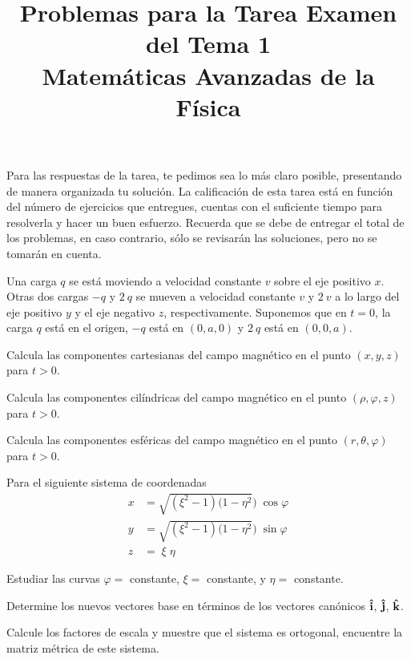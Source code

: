 \documentclass[12pt]{article}
\title{Problemas para la Tarea Examen del Tema 1\\ \large{Matemáticas Avanzadas de la Física}\vspace{-3ex}}
\date{ }
\begin{document}
\vspace{-4cm}
\renewcommand\labelenumii{\theenumi.{\arabic{enumii}}}
\maketitle
\fontsize{14}{14}\selectfont
Para las respuestas de la tarea, te pedimos sea lo más claro posible, presentando de manera organizada tu solución. La calificación de esta tarea está en función del número de ejercicios que entregues, cuentas con el suficiente tiempo para resolverla y hacer un buen esfuerzo. Recuerda que se debe de entregar el total de los problemas, en caso contrario, sólo se  revisarán las soluciones, pero no se tomarán en cuenta.
\begin{milista}
\item Una carga $q$ se está moviendo a velocidad constante $v$ sobre el eje positivo $x$. Otras dos cargas $-q$ y $2 \: q$ se mueven a velocidad constante $v$ y $2 \: v$ a lo largo del eje positivo $y$ y el eje negativo $z$, respectivamente. Suponemos que en $t = 0$, la carga $q$ está en el origen, $-q$ está en $(0, a, 0)$ y $2 \: q$ está en $(0, 0, a)$.
\begin{milista}
\item Calcula las componentes cartesianas del campo magnético en el punto $(x, y, z)$ para $t > 0$.
\item Calcula las componentes cilíndricas del campo magnético en el punto $(\rho, \varphi, z)$ para $t > 0$.
\item Calcula las componentes esféricas del campo magnético en el punto $(r, \theta, \varphi)$ para $t > 0$.
\end{milista}
\item Para el siguiente sistema de coordenadas
\begin{align*}
x &= \sqrt{(\xi^{2} -1) (1 - \eta^{2}}) \; \cos \varphi \\
y &= \sqrt{(\xi^{2} -1) (1 - \eta^{2}}) \; \sin \varphi \\
z &= \; \xi \; \eta
\end{align*}
\begin{milista}
\item Estudiar las curvas $\varphi =$ constante, $\xi =$ constante, y  $\eta =$ constante.
\item Determine los nuevos vectores base en términos de los vectores canónicos $\vu{i}$, $\vu{j}$, $\vu{k}$.
\item Calcule los factores de escala y muestre que el sistema es ortogonal, encuentre la matriz métrica de este sistema.

\end{milista}
\end{milista}
\end{document}
